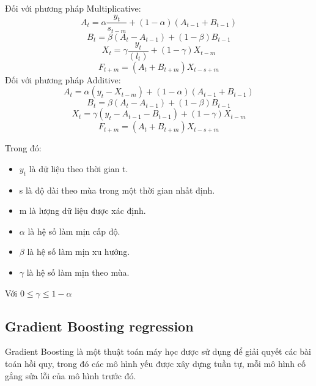 \documentclass{ieeeojies}
\begin{document}
Đối với phương pháp Multiplicative:
\begin{equation}
A_{t} = \alpha\frac{y_{t}}{s_{t-m}} + (1 - \alpha)(A_{t-1} + B_{t-1})    
\end{equation}
\begin{equation}
B_{t} = \beta(A_{t} - A_{t-1}) + (1 - \beta) B_{t-1}    
\end{equation}
\begin{equation}
X_{t} = \gamma\frac{y_{t}}{(l_{t})} + (1 - \gamma) X_{t-m}    
\end{equation}
\begin{equation}
F_{t+m} = (A_{t} + B_{t+m}) X_{t-s+m}    
\end{equation}
Đối với phương pháp Additive:
\begin{equation}
A_{t} = \alpha(y_{t} - X_{t-m}) + (1 - \alpha)(A_{t-1} + B_{t-1})
\end{equation}
\begin{equation}
B_{t} = \beta(A_{t} - A_{t-1}) + (1 - \beta) B_{t-1}   
\end{equation}
\begin{equation}
X_{t} = \gamma(y_{t} - A_{t-1} - B_{t-1}) + (1 - \gamma) X_{t-m}    
\end{equation}   
\begin{equation}
F_{t+m} = (A_{t} + B_{t+m}) X_{t-s+m}    
\end{equation}

Trong đó:
\begin{itemize}
    \item \(y_{t}\) là dữ liệu theo thời gian t.
    \item s là độ dài theo mùa trong một thời gian nhất định.
    \item m là lượng dữ liệu được xác định.
    \item \(\alpha\) là hệ số làm mịn cấp độ.
    \item \(\beta\) là hệ số làm mịn xu hướng.
    \item \(\gamma\) là hệ số làm mịn theo mùa.
\end{itemize}
Với \(0 \leq \gamma \leq 1-\alpha\)

\subsection{Gradient Boosting regression}
Gradient Boosting là một thuật toán máy học được sử dụng để giải quyết các bài toán hồi quy, trong đó các mô hình yếu được xây dựng tuần tự, mỗi mô hình cố gắng sửa lỗi của mô hình trước đó. 
\end{document}
